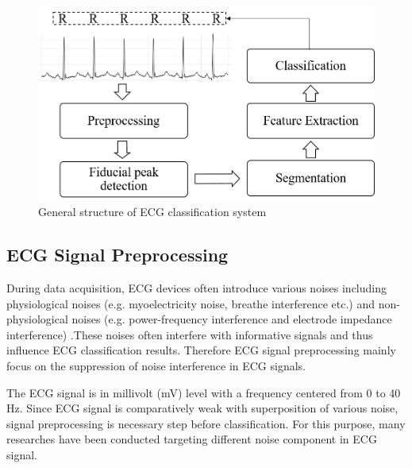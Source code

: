  \begin{figure}[thpb]
 	\centering
 	\includegraphics[scale=0.7]{Fig/general_flow.png}  
 	\caption{General structure of ECG classification system}
 	\label{fig:1-1}
 \end{figure}


\subsection{ECG Signal Preprocessing}

During data acquisition, ECG devices often introduce various noises including physiological noises (e.g. myoelectricity noise, breathe interference etc.) and non-physiological noises (e.g. power-frequency interference and electrode impedance interference) \cite{denoise}.These noises often interfere with informative signals and thus influence ECG classification results. Therefore ECG signal preprocessing mainly focus on the suppression of noise interference in ECG signals.

The ECG signal is in millivolt (mV) level with a frequency centered from 0 to 40 Hz\cite{thakor1984estimation}. Since ECG signal is comparatively weak with superposition of various noise, signal preprocessing is necessary step before classification. For this purpose, many researches have been conducted targeting different noise component in ECG signal.

